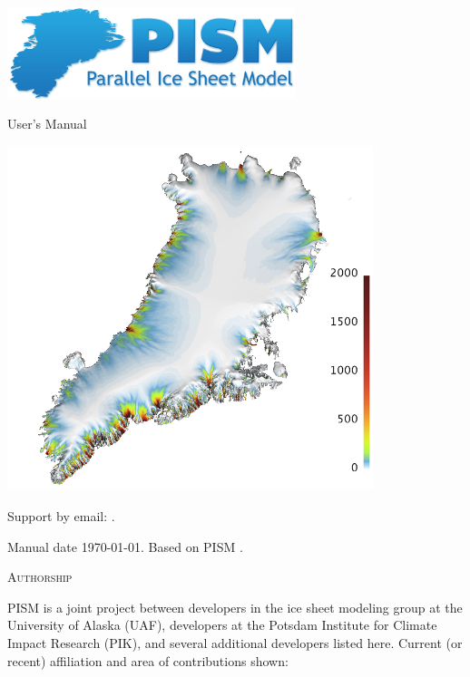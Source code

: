 \documentclass[titlepage,letterpaper,final]{scrartcl}
\begin{document}
\graphicspath{{figs/}}

\begin{titlepage}

  \begin{center}

    \includegraphics[width=3.3in,keepaspectratio=true]{pism-logo}

    \vspace{2.0cm}
    {\Huge {} User's Manual}
    \vspace{2.0cm}

    \includegraphics[width=4.2in,keepaspectratio=true]{grn-1km-csurf}

    \vfill

    \small Support by email: \PISMEMAIL.
    \medskip

    Manual date \today. Based on PISM \PISMREV.
    \medskip

    \PISMDOWNLOADMSG
  \end{center}
\end{titlepage}

\newpage
\phantom{bob}

\centerline{\textsc{Authorship}}
\bigskip

\normalspacing
PISM is a joint project between developers in the ice sheet modeling group at the University of Alaska (UAF), developers at the Potsdam Institute for Climate Impact Research (PIK), and several additional developers listed here.  Current (or recent) affiliation and area of contributions shown:
\bigskip
\normalspacing
\end{document}
